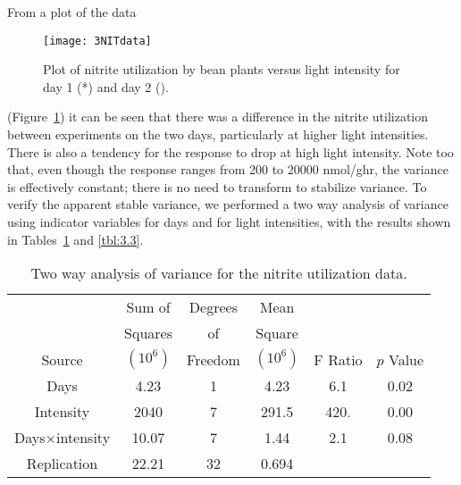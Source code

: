 From a plot of the data
\begin{figure}
  \centerline{\texttt{[image: 3NITdata]}}%
  \caption{Plot of nitrite utilization by bean plants
    versus light intensity for day 1 (*) and day 2 ().}
  \label{fig:NITdata}
\end{figure}
(Figure~\ref{fig:NITdata}) it can be seen that there
was a difference in the nitrite utilization
between experiments on the two days,
particularly at higher light intensities.
There is also a tendency for the response to drop at high light
intensity.
Note too that, even though the response ranges from 200 to 20000
nmol/ghr, the variance is effectively constant;  there is no
need to transform to stabilize variance.
To verify the apparent stable variance, we performed a two way
analysis of variance using indicator variables for days and for
light intensities, with the results shown in
Tables~\ref{tbl:3.2} and \ref{tbl:3.3}.
\begin{table}
  \caption{
  Two way analysis of variance for the nitrite utilization data.
  }\label{tbl:3.2}
  \begin{center}
    \begin{tabular}{cccccc}\hline
      &\multicolumn{1}{c}{Sum of} & \multicolumn{1}{c}{Degrees}
      &\multicolumn{1}{c}{Mean}\\ & \multicolumn{1}{c}{Squares} &
      \multicolumn{1}{c}{of} &\multicolumn{1}{c}{Square}\\
      \multicolumn{1}{c}{Source} & \multicolumn{1}{c}{$( 10^6 )$} &
      \multicolumn{1}{c}{Freedom} & \multicolumn{1}{c}{$( 10^6 )$} &
      \multicolumn{1}{c}{F Ratio} & \multicolumn{1}{c}{$p$ Value}\\ \hline
      Days&4.23&1&4.23&6.1&0.02\\
      Intensity&2040&7&291.5&420.&0.00\\
      Days$\times$intensity&10.07&7&1.44&2.1&0.08\\ \hline
      Replication&22.21&32&0.694\\ \hline
    \end{tabular}
  \end{center}
\end{table}

